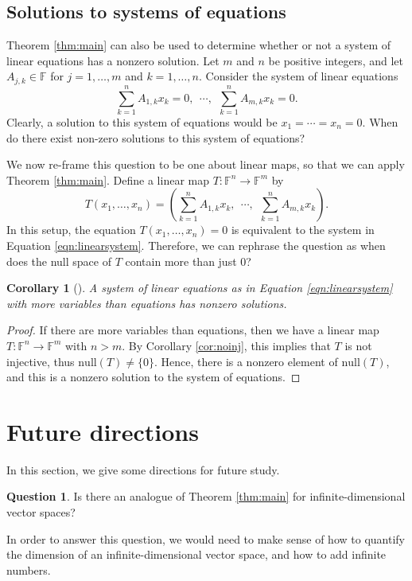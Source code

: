\documentclass[11pt,reqno]{amsart}
\newtheorem{corollary}[theorem]{Corollary}
\theoremstyle{definition}
\newtheorem{question}[theorem]{Question}
\newcommand{\F}{\mathbb{F}}
\newcommand{\nul}{\mathrm{null}}
\begin{document}
\subsection{Solutions to systems of equations}

Theorem \ref{thm:main} can also be used to determine whether or not a system of linear equations has a nonzero solution. Let $m$ and $n$ be positive integers, and let $A_{j,k} \in \F$ for $j = 1,\ldots,m$ and $k=1,\ldots, n$. Consider the system of linear equations 
\begin{equation}
\label{eqn:linearsystem}
    \sum_{k = 1}^n A_{1,k} x_k = 0, \ \ 
    \cdots ,\ \ 
    \sum_{k = 1}^n A_{m,k} x_k = 0.
\end{equation}
Clearly, a solution to this system of equations would be $x_1 = \cdots = x_n = 0$. When do there exist non-zero solutions to this system of equations?

We now re-frame this question to be one about linear maps, so that we can apply Theorem \ref{thm:main}. Define a linear map $T: \F^n \rightarrow \F^m$ by
$$
T(x_1, \ldots, x_n) = \left( \sum_{k = 1}^n A_{1,k} x_k , \ \ 
    \cdots ,\ \ 
    \sum_{k = 1}^n A_{m,k} x_k  \right).
$$
In this setup, the equation $T(x_1, \ldots, x_n ) = 0$ is equivalent to the system in Equation \ref{eqn:linearsystem}. Therefore, we can rephrase the question as when does the null space of $T$ contain more than just $0$?
\begin{corollary}[{\cite[3.26]{axler}}]
A system of linear equations as in Equation \ref{eqn:linearsystem} with more variables than equations has nonzero solutions.
\end{corollary}
\begin{proof}
If there are more variables than equations, then we have a linear map $T: \F^n \rightarrow \F^m$ with $n>m$. By Corollary \ref{cor:noinj}, this implies that $T$ is not injective, thus $\nul(T) \not = \{0\}$. Hence, there is a nonzero element of $\nul(T)$, and this is a nonzero solution to the system of equations.
\end{proof}


\section{Future directions}
\label{sec:directions}

In this section, we give some directions for future study.

\begin{question}
Is there an analogue of Theorem \ref{thm:main} for infinite-dimensional vector spaces? 
\end{question}
In order to answer this question, we would need to make sense of how to quantify the dimension of an infinite-dimensional vector space, and how to add infinite numbers.
\end{document}
